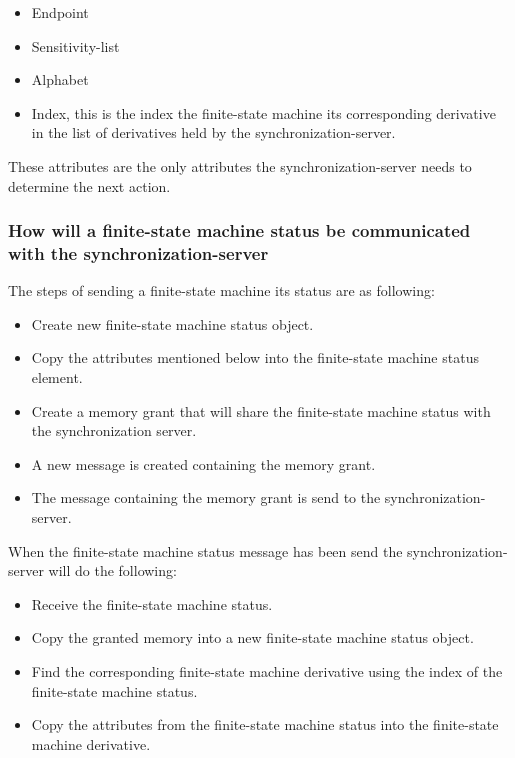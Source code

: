 \begin{itemize}
\tightlist
\item
  Endpoint
\item
  Sensitivity-list
\item
  Alphabet
\item
  Index, this is the index the finite-state machine its corresponding
  derivative in the list of derivatives held by the
  synchronization-server.
\end{itemize}

These attributes are the only attributes the synchronization-server
needs to determine the next action.

\hypertarget{how-will-a-finite-state-machine-status-be-communicated-with-the-synchronization-server}{%
\subsubsection{How will a finite-state machine status be communicated
with the
synchronization-server}\label{how-will-a-finite-state-machine-status-be-communicated-with-the-synchronization-server}}

The steps of sending a finite-state machine its status are as following:

\begin{itemize}
\tightlist
\item
  Create new finite-state machine status object.
\item
  Copy the attributes mentioned below into the finite-state machine
  status element.
\item
  Create a memory grant that will share the finite-state machine status
  with the synchronization server.
\item
  A new message is created containing the memory grant.
\item
  The message containing the memory grant is send to the
  synchronization-server.
\end{itemize}

When the finite-state machine status message has been send the
synchronization-server will do the following:

\begin{itemize}
\tightlist
\item
  Receive the finite-state machine status.
\item
  Copy the granted memory into a new finite-state machine status object.
\item
  Find the corresponding finite-state machine derivative using the index
  of the finite-state machine status.
\item
  Copy the attributes from the finite-state machine status into the
  finite-state machine derivative.
\end{itemize}

